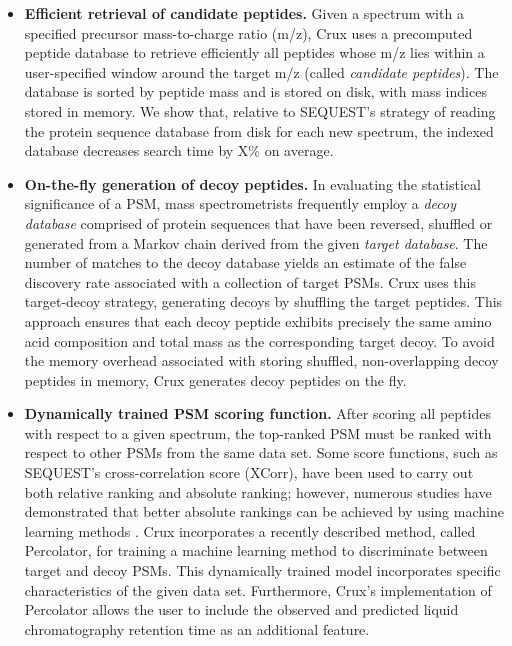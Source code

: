 \documentclass{bioinfo}
\renewcommand{\cite}{\citep}
\begin{document}
\begin{itemize}

\item {\bf Efficient retrieval of candidate peptides.}  Given a
  spectrum with a specified precursor mass-to-charge ratio (m/z), Crux
  uses a precomputed peptide database to retrieve efficiently all
  peptides whose m/z lies within a user-specified window around the
  target m/z (called {\em candidate peptides}).  The database is
  sorted by peptide mass and is stored on disk, with mass indices
  stored in memory.  We show that, relative to SEQUEST's strategy of
  reading the protein sequence database from disk for each new
  spectrum, the indexed database decreases search time by X\% on
  average.

\item {\bf On-the-fly generation of decoy peptides.}  In evaluating
  the statistical significance of a PSM, mass spectrometrists
  frequently employ a {\em decoy database} comprised of protein
  sequences that have been reversed, shuffled or generated from a
  Markov chain derived from the given {\em target database}.  The
  number of matches to the decoy database yields an estimate of the
  false discovery rate associated with a collection of target PSMs.
  Crux uses this target-decoy strategy, generating decoys by shuffling
  the target peptides.  This approach ensures that each decoy peptide
  exhibits precisely the same amino acid composition and total mass as
  the corresponding target decoy.  To avoid the memory overhead
  associated with storing shuffled, non-overlapping decoy peptides in
  memory, Crux generates decoy peptides on the fly.

\item {\bf Dynamically trained PSM scoring function.}  After scoring
  all peptides with respect to a given spectrum, the top-ranked PSM
  must be ranked with respect to other PSMs from the same data set.
  Some score functions, such as SEQUEST's cross-correlation score
  (XCorr), have been used to carry out both relative ranking and
  absolute ranking; however, numerous studies have demonstrated that
  better absolute rankings can be achieved by using machine learning
  methods \cite{keller:empirical, anderson:new, elias:intensity,
  kall:semi-supervised}.  Crux incorporates a recently described
  method, called Percolator, for training a machine learning method to
  discriminate between target and decoy PSMs.  This dynamically
  trained model incorporates specific characteristics of the given
  data set.  Furthermore, Crux's implementation of Percolator allows
  the user to include the observed and predicted liquid chromatography
  retention time \cite{klammer:effect} as an additional feature.


\end{itemize}
\end{document}
